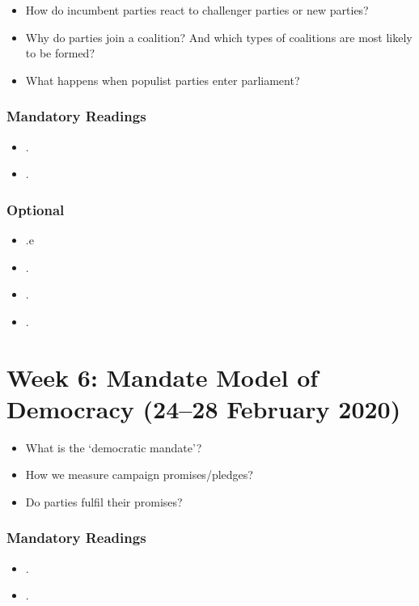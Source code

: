 \documentclass[abstract=on,parskip=full,headings=standardclasses,fontsize=11pt,paper=a4]{scrartcl}
\begin{document}
\begin{itemize}
\renewcommand\labelitemi{--}
\item How do incumbent parties react to challenger parties or new parties?
\item Why do parties join a coalition? And which types of coalitions are most likely to be formed?
\item What happens when populist parties enter parliament?
\end{itemize}

\subsubsection*{Mandatory Readings}
\begin{itemize}
\item {}.
\item {}.
\end{itemize}


\subsubsection*{Optional}
\begin{itemize}
\item {}.e
\item {}.
\item {}.
\item {}.
\end{itemize}






\section{Week 6:  Mandate Model of Democracy (24--28 February 2020)}


\begin{itemize}
\renewcommand\labelitemi{--}
\item What is the `democratic mandate'? 
\item How we measure campaign promises/pledges?
\item Do parties fulfil their promises?
\end{itemize}

\subsubsection*{Mandatory Readings}
\begin{itemize}
\item {}.
\item {}.
\end{itemize}
\end{document}
